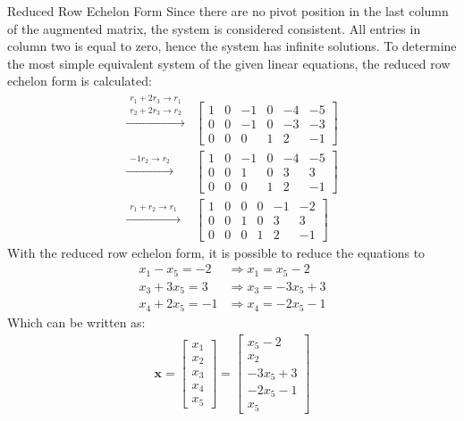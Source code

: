\begin{example}{Reduced Row Echelon Form}
Since there are no pivot position in the last column of the augmented matrix, the system is considered consistent. All entries in column two is equal to zero, hence the system has infinite solutions. To determine the most simple equivalent system of the given linear equations, the reduced row echelon form is calculated:
\begin{align*}
  \xrightarrow{\substack{r_1+2r_3\rightarrow r_1\\r_2+2r_3\rightarrow r_2}}
    &\begin{bmatrix}
  	    1 & 0 & -1 &0 & -4 & -5 \\
 	    0 & 0 & -1 & 0 & -3 & -3 \\
	    0 & 0 & 0 & 1 & 2 & -1
     \end{bmatrix}\\
  \xrightarrow{\substack{-1r_2\rightarrow r_2}}
  &\begin{bmatrix}
  	    1 & 0 & -1 &0 & -4 & -5 \\
 	    0 & 0 & 1 & 0 & 3 & 3 \\
	    0 & 0 & 0 & 1 & 2 & -1
     \end{bmatrix}\\
     \xrightarrow{\substack{r_1+r_2\rightarrow r_1}}
     &\begin{bmatrix}
        1 & 0 & 0 & 0 &-1 &-2 \\
 	    0 & 0 & 1 & 0 & 3 & 3 \\
	    0 & 0 & 0 & 1 & 2 &-1
     \end{bmatrix}
    \end{align*}
With the reduced row echelon form, it is possible to reduce the equations to
	\begin{align*}
		x_1-x_5 =-2   &\Rightarrow x_1=x_5 -2\\
        x_3 + 3x_5 =3 &\Rightarrow x_3=-3x_5+3\\
        x_4 +2x_5 = -1 &\Rightarrow	x_4=-2x_5-1
	\end{align*}
Which can be written as:
    \begin{align*}
    	\textbf{x}=
        \begin{bmatrix}
       	    x_1\\ x_2 \\ x_3\\ x_4 \\x_5
        \end{bmatrix} =
        \begin{bmatrix}
        	x_5- 2\\ x_2\\ -3x_5 +3\\-2x_5-1\\ x_5 

\end{bmatrix}
\end{align*}
\end{example}
